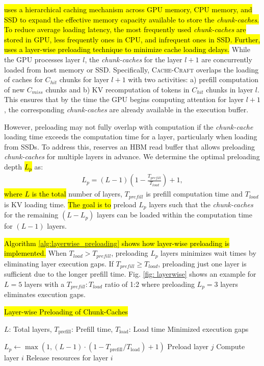 \hl{
\sys uses a hierarchical caching mechanism across GPU memory, CPU memory, and SSD to expand the effective memory capacity available to store the \textit{chunk-caches}. To reduce average loading latency, the most frequently used \textit{chunk-caches} are stored in GPU, less frequently ones in CPU, and infrequent ones in SSD.
Further, \sys uses a layer-wise preloading technique to minimize cache loading delays.} 
While the GPU processes layer \(l\), the \textit{chunk-caches} for the layer \(l+1\) are concurrently loaded from host memory or SSD.
Specifically, \textsc{Cache-Craft} overlaps the loading of caches for $C_{hit}$ chunks for layer \(l+1\) with two activities: a) prefill computation of new \(C_{miss}\) chunks and b) KV recomputation of tokens in $C_{hit}$ chunks in layer \(l\). This ensures that by the time the GPU begins computing attention for layer \(l+1\), the corresponding \textit{chunk-caches} are already available in the execution buffer.

However, preloading may not fully overlap with computation if the \textit{chunk-cache} loading time exceeds the computation time for a layer, particularly when loading from SSDs. To address this, \sys reserves an HBM read buffer that allows preloading \textit{chunk-caches} for multiple layers in advance. We determine the optimal preloading depth \hl{$L_{p}$} as:
\begin{align}
    L_p = (L-1) \left( 1 - \frac{T_{prefill}}{T_{load}} \right) + 1,
    \label{eq:layerwise}
\end{align}
\hl{where $L$ is the total} number of layers, $T_{prefill}$ is prefill computation time and $T_{load}$ is KV loading time.
\hl{The goal is to} preload \(L_p\) layers such that the \textit{chunk-caches} for the remaining \((L-L_p)\) layers can be loaded within the computation time for \((L-1)\) layers. 


\hl{Algorithm \ref{alg:layerwise_preloading} shows how layer-wise preloading is implemented.}
When \(T_{load} > T_{prefill}\), preloading \(L_p\) layers minimizes wait times by eliminating layer execution gaps. If \(T_{prefill} \geq T_{load}\), preloading just one layer is sufficient due to the longer prefill time. Fig. \ref{fig: layerwise} shows an example for \(L=5\) layers with a \(T_{prefill} : T_{load}\) ratio of 1:2 where preloading \(L_p=3\) layers eliminates execution gaps.



\begin{algorithm}[t]
\small
\caption{\hl{Layer-wise Preloading of Chunk-Caches}}
\label{alg:layerwise_preloading}
\begin{algorithmic}[1]
\REQUIRE $L$: Total layers, $T_{\text{prefill}}$: Prefill time, $T_{\text{load}}$: Load time
\ENSURE Minimized execution gaps

\STATE $L_p \gets \max(1, (L-1) \cdot (1 - T_{\text{prefill}} / T_{\text{load}}) + 1)$
        \STATE Preload layer $j$
    \ENDFOR
    \STATE Compute layer $i$
    \STATE Release resources for layer $i$
\ENDFOR
\end{algorithmic}
\end{algorithm}




